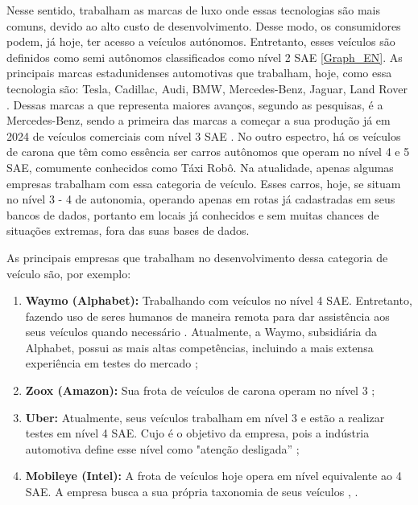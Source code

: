 Nesse sentido, trabalham as marcas de luxo onde essas tecnologias são mais comuns, devido ao alto custo de desenvolvimento. Desse modo, os consumidores podem, já hoje, ter acesso a veículos autónomos. Entretanto, esses veículos são definidos como semi autônomos classificados como nível 2 SAE \ref{Graph_EN}. As principais marcas estadunidenses automotivas que trabalham, hoje, como essa tecnologia são:  Tesla, Cadillac, Audi, BMW, Mercedes-Benz, Jaguar, Land Rover \cite{caio}. 
Dessas marcas a que representa maiores avanços, segundo as pesquisas, é a Mercedes-Benz, sendo  a primeira das marcas a começar a sua produção já em 2024 de veículos comerciais com nível 3 SAE \cite{mercedes3}.
No outro espectro, há os veículos de carona que têm como essência ser carros autônomos que operam no nível 4 e 5 SAE, comumente conhecidos como Táxi Robô. Na atualidade, apenas algumas empresas trabalham com essa categoria de veículo. Esses carros, hoje, se situam no nível 3 - 4 de autonomia, operando apenas em rotas já cadastradas em seus bancos de dados, portanto em locais já conhecidos e sem muitas chances de situações extremas, fora das suas bases de dados. 

As principais empresas que trabalham no desenvolvimento dessa categoria de veículo são, por exemplo:

\begin{enumerate}

   \item \textbf{Waymo (Alphabet):}
         Trabalhando com veículos no nível 4 SAE. Entretanto, fazendo uso de seres humanos de maneira remota para dar assistência aos seus veículos quando necessário \cite{waymo}. Atualmente, a Waymo, subsidiária da Alphabet, possui as mais altas competências, incluindo a mais extensa experiência em testes do mercado \cite{CAM};
   \item \textbf{Zoox (Amazon):}
         Sua frota de veículos de carona operam no nível 3 \cite{zoox};
   \item \textbf{Uber:}
         Atualmente, seus veículos trabalham em nível 3 e estão a realizar testes em nível 4 SAE. Cujo é o objetivo da empresa, pois a indústria automotiva define esse nível como "atenção desligada” \cite{uber};
   \item \textbf{Mobileye (Intel):}
         A frota de veículos hoje opera em nível equivalente ao 4 SAE. A empresa busca a sua própria taxonomia de seus veículos \cite{mobileye}, \cite{mobileye1}.
\end{enumerate}

